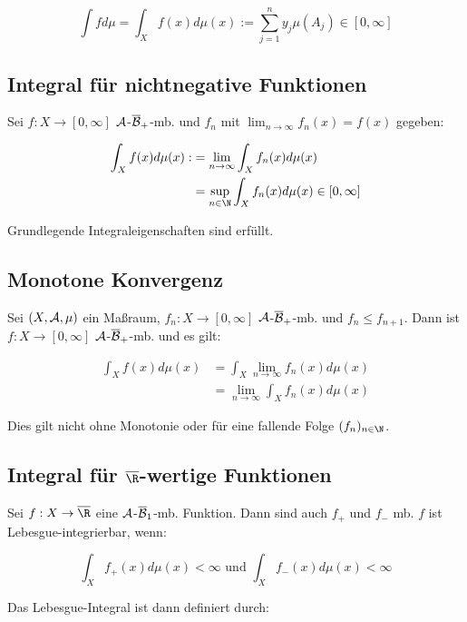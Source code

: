 $$\int f d\mu = \int_X f(x) d\mu(x) := \sum_{j=1}^n y_j \mu(A_j) \in [0, \infty]$$

\subsection*{Integral für nichtnegative Funktionen}

Sei $f : X \to [0, \infty]$ $\mathcal{A}$-$\overline{\mathcal{B}}_+$-mb. und $f_n$ mit $\lim_{n \to \infty} f_n(x) = f(x)$ gegeben:

\vspace{-4mm}
\begin{align*}
	\int_X f(x) d\mu(x) :&= \lim_{n \to \infty} \int_X f_n(x) d\mu(x) \\
	                &= \sup_{n \in \N} \int_X f_n(x) d\mu(x) \in [0,\infty]
\end{align*}

Grundlegende Integraleigenschaften sind erfüllt.

\subsection*{Monotone Konvergenz}

Sei $(X, \mathcal{A}, \mu)$ ein Maßraum, $f_n : X \to [0,\infty]$ $\mathcal{A}$-$\overline{\mathcal{B}}_+$-mb. und $f_n \leq f_{n+1}$. Dann ist $f : X \to [0,\infty]$ $\mathcal{A}$-$\overline{\mathcal{B}}_+$-mb. und es gilt:

\vspace{-4mm}
\begin{align*}
	\int_X f(x) d\mu(x) &= \int_X \lim_{n \to \infty} f_n(x) d\mu(x)\\
	               &= \lim_{n \to \infty} \int_X f_n(x) d\mu(x)
\end{align*}

Dies gilt nicht ohne Monotonie oder für eine fallende Folge $(f_n)_{n \in \N}$.

\subsection*{Integral für $\overline\R$-wertige Funktionen}

Sei $f : X \to \overline\R$ eine $\mathcal{A}$-$\overline{\mathcal{B}}_1$-mb. Funktion. Dann sind auch $f_+$ und $f_-$ mb. $f$ ist Lebesgue-integrierbar, wenn:

\vspace{-4mm}
$$\int_X f_+(x) d\mu(x) < \infty \text{ und } \int_X f_-(x) d\mu(x) < \infty$$

Das Lebesgue-Integral ist dann definiert durch:

